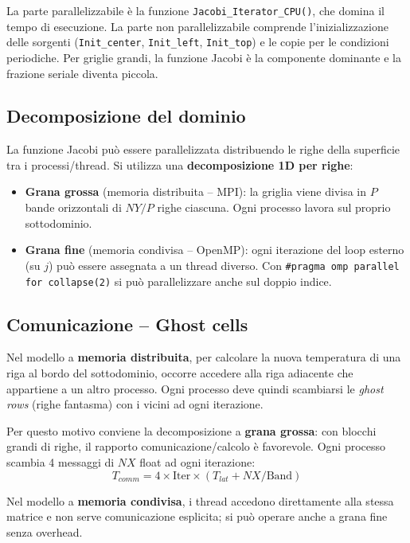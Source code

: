 \documentclass[a4paper,12pt]{article}
\begin{document}
La parte parallelizzabile \`e la funzione \texttt{Jacobi\_Iterator\_CPU()}, che domina il tempo di esecuzione. La parte non parallelizzabile comprende l'inizializzazione delle sorgenti (\texttt{Init\_center}, \texttt{Init\_left}, \texttt{Init\_top}) e le copie per le condizioni periodiche. Per griglie grandi, la funzione Jacobi \`e la componente dominante e la frazione seriale diventa piccola.

\subsection{Decomposizione del dominio}

La funzione Jacobi pu\`o essere parallelizzata distribuendo le righe della superficie tra i processi/thread. Si utilizza una \textbf{decomposizione 1D per righe}:

\begin{itemize}
    \item \textbf{Grana grossa} (memoria distribuita -- MPI): la griglia viene divisa in $P$ bande orizzontali di $NY/P$ righe ciascuna. Ogni processo lavora sul proprio sottodominio.
    \item \textbf{Grana fine} (memoria condivisa -- OpenMP): ogni iterazione del loop esterno (su $j$) pu\`o essere assegnata a un thread diverso. Con \texttt{\#pragma omp parallel for collapse(2)} si pu\`o parallelizzare anche sul doppio indice.
\end{itemize}

\subsection{Comunicazione -- Ghost cells}

Nel modello a \textbf{memoria distribuita}, per calcolare la nuova temperatura di una riga al bordo del sottodominio, occorre accedere alla riga adiacente che appartiene a un altro processo. Ogni processo deve quindi scambiarsi le \textit{ghost rows} (righe fantasma) con i vicini ad ogni iterazione.

Per questo motivo conviene la decomposizione a \textbf{grana grossa}: con blocchi grandi di righe, il rapporto comunicazione/calcolo \`e favorevole. Ogni processo scambia 4 messaggi di $NX$ float ad ogni iterazione:
\[
T_{comm} = 4 \times \text{Iter} \times (T_{lat} + NX / \text{Band})
\]

Nel modello a \textbf{memoria condivisa}, i thread accedono direttamente alla stessa matrice e non serve comunicazione esplicita; si pu\`o operare anche a grana fine senza overhead.
\end{document}
